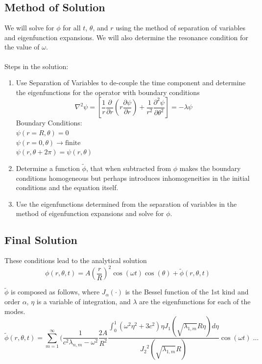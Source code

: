 \documentclass{homework}
\begin{document}
\subsection{Method of Solution}
We will solve for $\phi$ for all $t$, $\theta$, and $r$ using the method of separation of variables and eigenfunction expansions. We will also determine the resonance condition for the value of $\omega$. 
\\ \\
\noindent Steps in the solution:
\begin{enumerate}
    \item Use Separation of Variables to de-couple the time component and determine the eigenfunctions for the operator with boundary conditions
    \[ \nabla^2 \psi = \left[ \frac{1}{r} \frac{\partial}{\partial r} \left(r \frac{\partial \psi}{\partial r}\right) + \frac{1}{r^2} \frac{\partial^2 \psi}{\partial \theta^2} \right] = - \lambda \psi \]
    \noindent Boundary Conditions: \\
    $ \psi(r=R, \theta) = 0 $ \\
    $ \psi(r=0, \theta) \rightarrow \textrm{finite} $ \\
    $ \psi(r, \theta + 2\pi) = \psi(r, \theta) $ \\
    \item Determine a function $\tilde{\phi}$, that when subtracted from $\phi$ makes the boundary conditions homogeneous but perhaps introduces inhomogeneities in the initial conditions and the equation itself.
    \item Use the eigenfunctions determined from the separation of variables in the method of eigenfunction expansions and solve for $\phi$.
\end{enumerate} 

\newpage
\subsection{Final Solution}
\noindent These conditions lead to the analytical solution 
$$ \phi(r, \theta, t) = A \left(\frac{r}{R} \right)^2 \cos(\omega t) \cos(\theta) + \tilde{\phi} (r, \theta, t)$$ 

\noindent $\tilde{\phi}$ is composed as follows, where $J_\alpha (\cdot)$ is the Bessel function of the 1st kind and order $\alpha$, $\eta$ is a variable of integration, and $\lambda$ are the eigenfunctions for each of the modes.
$$ \tilde{\phi} (r, \theta, t) = \sum_{m=1}^\infty \Biggl( \frac{1}{c^2 \lambda_{n,m} - \omega^2} \frac{2A}{R^2} \frac{\int_0^1 \left( \omega^2 \eta^2 + 3c^2 \right) \eta J_1\left( \sqrt{\lambda_{1,m}} R \eta \right) d\eta }{{J_2}^2 \left( \sqrt{\lambda_{1,m}} R \right)} \cos(\omega t) \; \dots $$
\end{document}
